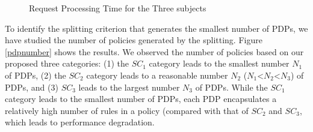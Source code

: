  \begin{figure}[h!]
  \centering
  \caption{Request Processing Time for the Three subjects}
  \label{fig:processing time}
\end{figure}
 

To identify the splitting criterion that generates the smallest number of PDPs, we have studied the number of policies generated by the
 splitting. Figure \ref{pdpnumber} shows the results.
We observed the number of policies based on our proposed three categories: (1) the $SC_{1}$ category leads to the smallest number $N_1$ of PDPs, 
(2) the $SC_{2}$ category leads to a reasonable number
 $N_2$ ($N_1$<$N_2$<$N_3$) of PDPs, and (3) $SC_{3}$ leads to the largest number $N_3$ of PDPs.
While the $SC_{1}$ category leads to the smallest number of PDPs, each PDP encapsulates a relatively high number of rules in a policy (compared
with that of $SC_{2}$ and $SC_{3}$, which leads to performance degradation. 

